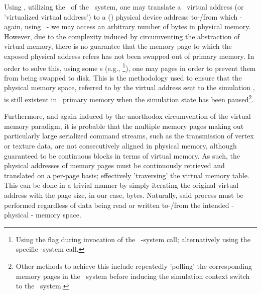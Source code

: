 Using \dvttermsimics , utilizing the \dvttermmmu\ of the \dvttermtarget\ system, one may translate a \dvttermtarget\ virtual address (or 'virtualized virtual address') to a (\dvttermtarget ) physical device address; to-/from which - again, using \dvttermsimics\ - we may access an arbitrary number of bytes in physical memory.
However, due to the complexity induced by circumventing the abstraction of virtual memory, there is no guarantee that the memory page to which the exposed physical address refers has not been swapped out of primary memory.
In order to solve this, using some \dvttermos s (e.g., \dvttermfedora \footnote{Using the  flag during invocation of the \dvttermlinux\ -system call; alternatively using the specific -system call.}), one may  pages in order to prevent them from being swapped to disk.
This is the methodology used to ensure that the physical memory space, referred to by the virtual address sent to the simulation \dvttermhost , is still existent in \dvttermtarget\ primary memory when the simulation state has been paused\footnote{Other methods to achieve this include repeatedly 'polling' the corresponding memory pages in the \dvttermtarget\ system before inducing the simulation context switch to the \dvttermhost\ system.}.

Furthermore, and again induced by the unorthodox circumvention of the virtual memory paradigm, it is probable that the multiple memory pages making out particularly large serialized command streams, such as the transmission of vertex or texture data, are not consecutively aligned in physical memory, although guaranteed to be continuous blocks in terms of virtual memory.
As such, the physical addresses of memory pages must be continuously retrieved and translated on a per-page basis; effectively 'traversing' the virtual memory table.
This can be done in a trivial manner by simply iterating the original virtual address with the \textit{\dvttermtarget } page size, in our case,  bytes.
Naturally, said process must be performed regardless of data being read or written to-/from the intended - physical - memory space.



